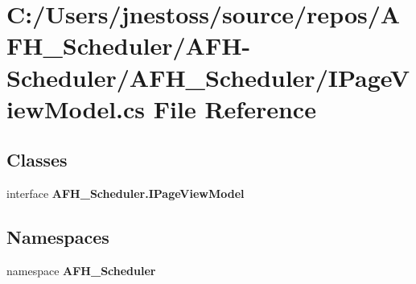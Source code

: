 \section{C\+:/\+Users/jnestoss/source/repos/\+A\+F\+H\+\_\+\+Scheduler/\+A\+F\+H-\/\+Scheduler/\+A\+F\+H\+\_\+\+Scheduler/\+I\+Page\+View\+Model.cs File Reference}
\label{_i_page_view_model_8cs}
\subsection*{Classes}
\begin{DoxyCompactItemize}
\item 
interface \textbf{ A\+F\+H\+\_\+\+Scheduler.\+I\+Page\+View\+Model}
\end{DoxyCompactItemize}
\subsection*{Namespaces}
\begin{DoxyCompactItemize}
\item 
namespace \textbf{ A\+F\+H\+\_\+\+Scheduler}
\end{DoxyCompactItemize}
